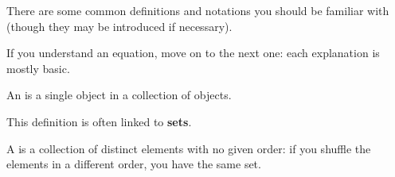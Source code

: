     There are some common definitions and notations you should be familiar with (though they may be introduced if necessary).
    
    If you understand an equation, move on to the next one: each explanation is mostly basic.\\
    
    \begin{definition}
        An  is a single object in a collection of objects.
    \end{definition}
    
    This definition is often linked to \textbf{sets}.\\
    
    \begin{definition}
        A  is a collection of distinct elements with no given order: if you shuffle the elements in a different order, you have the same set.
    \end{definition}
    
